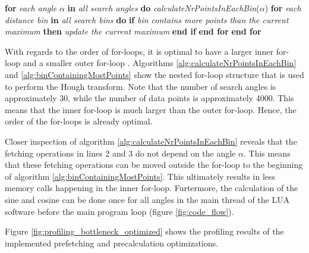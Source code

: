 \begin{algorithm}
    \begin{algorithmic}[1]
        \State \textbf{for} \textit{each angle} $\alpha$ \textbf{in} \textit{all search angles} \textbf{do}
        \State \hspace{1cm} \textit{calculateNrPointsInEachBin}($\alpha$)
        \State  \hspace{1cm} \textbf{for} \textit{each distance bin} \textbf{in} \textit{all search bins} \textbf{do}
        \State \hspace{2cm} \textbf{if} \textit{bin contains more points than the current maximum} \textbf{then}
        \State \hspace{3cm} \textit{update the current maximum}
        \State \hspace{2cm} \textbf{end if}
        \State \hspace{1cm} \textbf{end for}
        \State \textbf{end for}
        \EndFunction
    \end{algorithmic}
    \caption{Pseudo code of the function \lstinline[language=c]|LineFinder::calculateBinContainingMostPoints|.}
    \label{alg:binContainingMostPoints}
\end{algorithm}

With regards to the order of for-loops, it is optimal to have a larger inner for-loop and a smaller outer for-loop \cite[lecture 7, "temporal locality" ]{scientific_programming}. Algorithms \ref{alg:calculateNrPointsInEachBin} and \ref{alg:binContainingMostPoints} show the nested for-loop structure that is used to perform the Hough transform. Note that the number of search angles is approximately 30, while the number of data points is approximately 4000. This means that the inner for-loop is much larger than the outer for-loop. Hence, the order of the for-loops is already optimal.

Closer inspection of algorithm \ref{alg:calculateNrPointsInEachBin} reveals that the fetching operations in lines 2 and 3 do not depend on the angle $\alpha$. This means that these fetching operations can be moved outside the for-loop to the beginning of algorithm \ref{alg:binContainingMostPoints}. This ultimately results in less memory calls happening in the inner for-loop. Furtermore, the calculation of the sine and cosine can be done once for all angles in the main thread of the LUA software before the main program loop (figure \ref{fig:code_flow}).

Figure \ref{fig:profiling_bottleneck_optimized} shows the profiling results of the implemented prefetching and precalculation optimizations.

